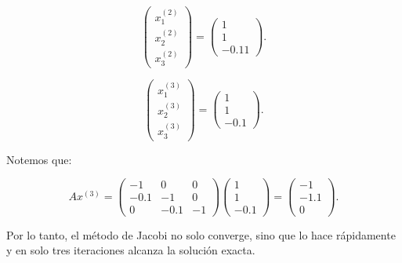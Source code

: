 \begin{homeworkProblem}
\begin{enumerate}
\begin{solucion}
\[
\begin{pmatrix}
            x_1^{(2)} \\
            x_2^{(2)} \\
            x_3^{(2)}
\end{pmatrix}
=
\begin{pmatrix}
            1 \\
            1 \\
            -0.11
\end{pmatrix}.
\]

\[
\begin{pmatrix}
            x_1^{(3)} \\
            x_2^{(3)} \\
            x_3^{(3)}
\end{pmatrix}
=
\begin{pmatrix}
            1 \\
            1 \\
            -0.1
\end{pmatrix}.
\]

Notemos que:

\[
Ax^{(3)} = \begin{pmatrix}
            -1 & 0 & 0\\
            -0.1 & -1 & 0\\
            0 & -0.1 & -1
        \end{pmatrix}
        \begin{pmatrix}
            1 \\
            1 \\
            -0.1
        \end{pmatrix}
        =
        \begin{pmatrix}
            -1 \\
            -1.1 \\
            0
        \end{pmatrix}.
\]

Por lo tanto, el método de Jacobi no solo converge, sino que lo hace rápidamente y en solo tres iteraciones alcanza la solución exacta.  
    \end{solucion}
\end{enumerate}
\end{homeworkProblem}

